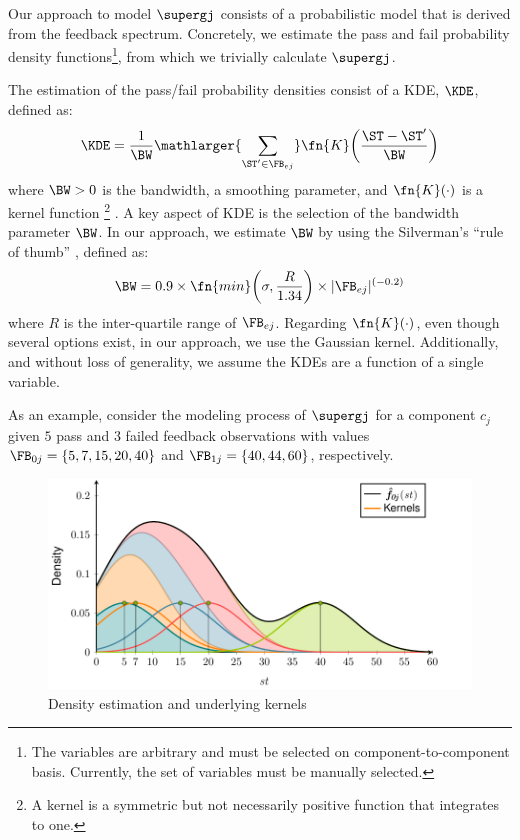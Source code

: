 Our approach to model $\supergj$ consists of a probabilistic model
that is derived from the feedback spectrum.
%
Concretely, we estimate the pass and fail probability density
functions\footnote{The variables are arbitrary and must be selected on
  component-to-component basis. Currently, the set of variables must
  be manually selected.}, from which we trivially calculate
$\supergj$.


The estimation of the pass/fail probability densities consist of a
\acf{KDE}, $\KDE$, defined as:
\begin{equation}
  \label{eq:nfge:kde}
  \KDE = \frac {1}{\BW}{\mathlarger{\sum_{\ST^\prime \in \FB_{ej}}} \fn{K}\bigg(\frac{\ST - \ST^\prime}{\BW}\bigg)}
\end{equation}
\noindent
where $\BW > 0$ is the bandwidth, a smoothing parameter, and
$\fn{K}(\cdot)$ is a kernel function%
\footnote{A kernel is a symmetric but not necessarily positive
  function that integrates to one.}  \citep{Rosenblatt56,Parzen62}.
%
A key aspect of \ac{KDE} is the selection of the bandwidth parameter
$\BW$.
%
In our approach, we estimate $\BW$ by using the Silverman's ``rule of
thumb'' \citep{Silverman86}, defined as:
\begin{equation}
  \BW = 0.9 \times \fn{min}\bigg(\sigma,\frac{R}{1.34}\bigg) \times |\FB_{ej}|^{(-0.2)}
\end{equation}
where $R$ is the inter-quartile range of $\FB_{ej}$.
%
Regarding $\fn{K}(\cdot)$, even though several options exist, in our
approach, we use the Gaussian kernel.
%
Additionally, and without loss of generality, we assume the \acp{KDE}
are a function of a single variable.


As an example, consider the modeling process of $\supergj$ for a
component $c_j$ given $5$ pass and $3$ failed feedback observations
with values $\FB_{0j} = \{5, 7, 15, 20, 40\}$ and $\FB_{1j} = \{40,
44, 60\}$, respectively.

\begin{figure}[!ht]
  \includegraphics[page=1,width=\columnwidth,clip]{figures/nfge/figures/main}
  \caption{Density estimation and underlying kernels}
  \label{fig:nfge:density}
\end{figure}

